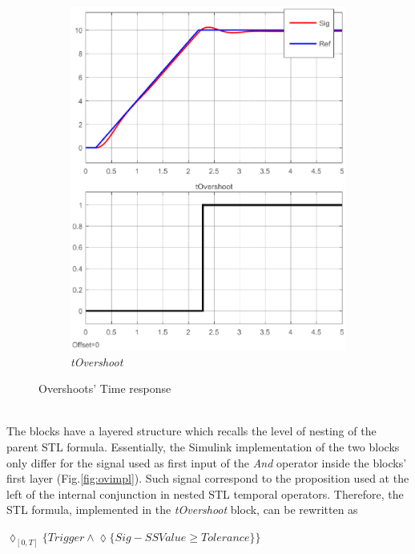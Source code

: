 \begin{figure}[!h]
\begin{subfigure}[b]{.45\textwidth}
\includegraphics[width=\textwidth]{Figs/tovsim.eps}
\caption{\textit{tOvershoot}}
\end{subfigure}
\caption{Overshoots' Time response}
\label{fig:ovtresp}
\end{figure}
\noindent
\\
The blocks have a layered structure which recalls the level of nesting of the parent STL formula. Essentially, the Simulink implementation of the two blocks only differ for the signal used as first input of the \textit{And} operator inside the blocks' first layer (Fig.\ref{fig:ovimpl}). Such signal correspond to the proposition used at the left of the internal conjunction in nested STL temporal operators. Therefore, the STL formula, implemented in the \textit{tOvershoot} block, can be rewritten as 
\begin{center}
$\lozenge_{[0,T]}\big\{Trigger \wedge \lozenge \{ Sig - SSValue \geq Tolerance\} \big\}$
\end{center}


